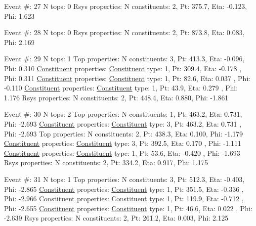 \begin{DoxyCode}
Event #: 27
      N tops: 0
      Rsys properties: N constituents:   2,   Pt:  375.7,   Eta:  -0.123,   Phi:   1.623

Event #: 28
      N tops: 0
      Rsys properties: N constituents:   2,   Pt:  873.8,   Eta:   0.083,   Phi:   2.169

Event #: 29
      N tops: 1
      Top properties: N constituents:   3,   Pt:  413.3,   Eta:  -0.096,   Phi:   0.310
          \hyperlink{classConstituent}{Constituent} properties: \hyperlink{classConstituent}{Constituent} type:   1,   Pt:  309.4,   Eta:  -0.178
      ,   Phi:   0.311
          \hyperlink{classConstituent}{Constituent} properties: \hyperlink{classConstituent}{Constituent} type:   1,   Pt:   82.6,   Eta:   0.037
      ,   Phi:  -0.110
          \hyperlink{classConstituent}{Constituent} properties: \hyperlink{classConstituent}{Constituent} type:   1,   Pt:   43.9,   Eta:   0.279
      ,   Phi:   1.176
      Rsys properties: N constituents:   2,   Pt:  448.4,   Eta:   0.880,   Phi:  -1.861

Event #: 30
      N tops: 2
      Top properties: N constituents:   1,   Pt:  463.2,   Eta:   0.731,   Phi:  -2.693
          \hyperlink{classConstituent}{Constituent} properties: \hyperlink{classConstituent}{Constituent} type:   3,   Pt:  463.2,   Eta:   0.731
      ,   Phi:  -2.693
      Top properties: N constituents:   2,   Pt:  438.3,   Eta:   0.100,   Phi:  -1.179
          \hyperlink{classConstituent}{Constituent} properties: \hyperlink{classConstituent}{Constituent} type:   3,   Pt:  392.5,   Eta:   0.170
      ,   Phi:  -1.111
          \hyperlink{classConstituent}{Constituent} properties: \hyperlink{classConstituent}{Constituent} type:   1,   Pt:   53.6,   Eta:  -0.420
      ,   Phi:  -1.693
      Rsys properties: N constituents:   2,   Pt:  334.2,   Eta:   0.917,   Phi:   1.175

Event #: 31
      N tops: 1
      Top properties: N constituents:   3,   Pt:  512.3,   Eta:  -0.403,   Phi:  -2.865
          \hyperlink{classConstituent}{Constituent} properties: \hyperlink{classConstituent}{Constituent} type:   1,   Pt:  351.5,   Eta:  -0.336
      ,   Phi:  -2.966
          \hyperlink{classConstituent}{Constituent} properties: \hyperlink{classConstituent}{Constituent} type:   1,   Pt:  119.9,   Eta:  -0.712
      ,   Phi:  -2.655
          \hyperlink{classConstituent}{Constituent} properties: \hyperlink{classConstituent}{Constituent} type:   1,   Pt:   46.6,   Eta:   0.022
      ,   Phi:  -2.639
      Rsys properties: N constituents:   2,   Pt:  261.2,   Eta:   0.003,   Phi:   2.125


\end{DoxyCode}
